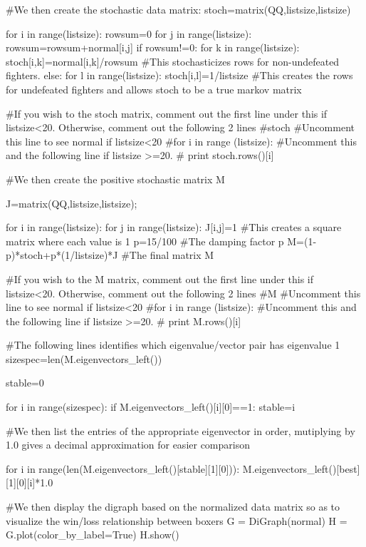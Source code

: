 \documentclass{ximera}
\begin{document}
\begin{sageCell}
            
#We then create the stochastic data matrix:
stoch=matrix(QQ,listsize,listsize)
    
for i in range(listsize):
    rowsum=0
    for j in range(listsize):
        rowsum=rowsum+normal[i,j]
    if rowsum!=0:
        for k in range(listsize):
            stoch[i,k]=normal[i,k]/rowsum #This stochasticizes rows for non-undefeated fighters.
    else:
        for l in range(listsize):
            stoch[i,l]=1/listsize #This creates the rows for undefeated fighters and allows stoch to be a true markov matrix

#If you wish to the stoch matrix, comment out the first line under this if listsize<20.  Otherwise, comment out the following 2 lines
#stoch #Uncomment this line to see normal if listsize<20
#for i in range (listsize): #Uncomment this and the following line if listsize >=20.
#    print stoch.rows()[i]

#We then create the positive stochastic matrix M

J=matrix(QQ,listsize,listsize);

for i in range(listsize):
    for j in range(listsize):
        J[i,j]=1 #This creates a square matrix where each value is 1
p=15/100 #The damping factor p
M=(1-p)*stoch+p*(1/listsize)*J #The final matrix M

#If you wish to the M matrix, comment out the first line under this if listsize<20.  Otherwise, comment out the following 2 lines
#M #Uncomment this line to see normal if listsize<20
#for i in range (listsize): #Uncomment this and the following line if listsize >=20.
#    print M.rows()[i]


#The following lines identifies which eigenvalue/vector pair has eigenvalue 1
sizespec=len(M.eigenvectors_left())

stable=0

for i in range(sizespec):
    if M.eigenvectors_left()[i][0]==1:
        stable=i

        
#We then list the entries of the appropriate eigenvector in order, mutiplying by 1.0 gives a decimal approximation for easier comparison
        
for i in range(len(M.eigenvectors_left()[stable][1][0])):
    M.eigenvectors_left()[best][1][0][i]*1.0
    

#We then display the digraph based on the normalized data matrix so as to visualize the win/loss relationship between boxers    
G = DiGraph(normal)
H = G.plot(color_by_label=True)
H.show()
 \end{sageCell}
\end{document}
